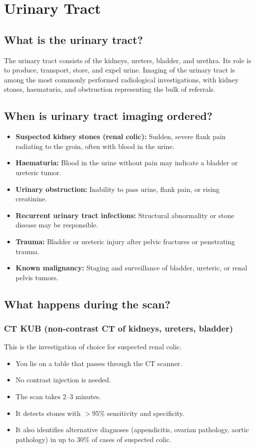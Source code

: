 \chapter{Urinary Tract}

\label{ch:ch50_urinary_tract}

\section{What is the urinary tract?}
The urinary tract consists of the kidneys, ureters, bladder, and urethra. Its role is to produce, transport, store, and expel urine. Imaging of the urinary tract is among the most commonly performed radiological investigations, with kidney stones, haematuria, and obstruction representing the bulk of referrals.

\section{When is urinary tract imaging ordered?}
\begin{itemize}
    \item \textbf{Suspected kidney stones (renal colic):} Sudden, severe flank pain radiating to the groin, often with blood in the urine.
    \item \textbf{Haematuria:} Blood in the urine without pain may indicate a bladder or ureteric tumor.
    \item \textbf{Urinary obstruction:} Inability to pass urine, flank pain, or rising creatinine.
    \item \textbf{Recurrent urinary tract infections:} Structural abnormality or stone disease may be responsible.
    \item \textbf{Trauma:} Bladder or ureteric injury after pelvic fractures or penetrating trauma.
    \item \textbf{Known malignancy:} Staging and surveillance of bladder, ureteric, or renal pelvis tumors.
\end{itemize}

\section{What happens during the scan?}

\subsection{CT KUB (non-contrast CT of kidneys, ureters, bladder)}
This is the investigation of choice for suspected renal colic.
\begin{itemize}
    \item You lie on a table that passes through the CT scanner.
    \item No contrast injection is needed.
    \item The scan takes 2--3 minutes.
    \item It detects stones with $>$95\% sensitivity and specificity.
    \item It also identifies alternative diagnoses (appendicitis, ovarian pathology, aortic pathology) in up to 30\% of cases of suspected colic.
\end{itemize}

